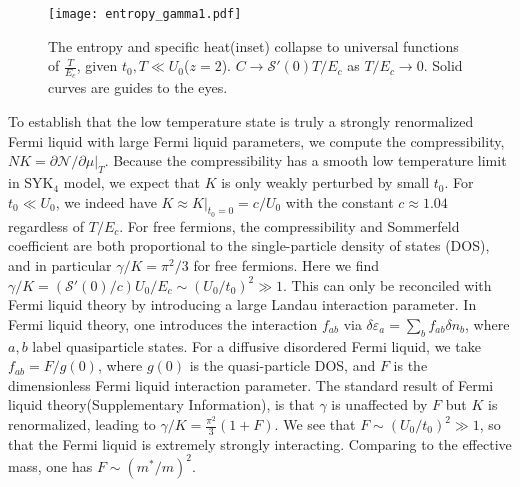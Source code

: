 \documentclass[twocolumn,floatfix,superscriptaddress]{revtex4-1}
\begin{document}
\begin{figure}[htbp] 
 \begin{center}
  \texttt{[image: entropy\_gamma1.pdf]}
 \caption{The entropy and specific heat(inset) collapse to universal functions of $\frac{T}{E_c}$, given $t_0,T\ll U_0$($z=2$).  $C\rightarrow \mathcal S'(0)T/E_c$ as $T/E_c\rightarrow 0$. Solid curves are guides to the eyes.%
  }    \label{thermo}
 \end{center}
 \end{figure}

 To establish that the low temperature state is truly a strongly renormalized Fermi liquid with large Fermi liquid parameters, we compute the compressibility, $NK = \left. \partial \mathcal N/\partial \mu\right|_T$.  Because the compressibility has a smooth low temperature limit in SYK$_4$ model, we expect that $K$ is only weakly perturbed by small $t_0$.  For $t_0 \ll U_0$, we indeed have $K \approx \left. K\right|_{t_0=0} = c/U_0$ with the constant $c\approx 1.04$ regardless of $T/E_c$.  For free fermions, the compressibility and Sommerfeld coefficient are both proportional to the single-particle density of states (DOS), and in particular $\gamma/K = \pi^2/3$ for free fermions.  Here we find $\gamma/K = (\mathcal{S}'(0)/c) U_0/E_c \sim (U_0/t_0)^2 \gg 1$.  This can only be reconciled with Fermi liquid theory by introducing a large Landau interaction parameter.  In Fermi liquid theory, one introduces the interaction $f_{ab}$ via $\delta\varepsilon_a=\sum_b f_{ab}\delta n_b$, where $a,b$ label quasiparticle states.   For a diffusive disordered Fermi liquid, we take $f_{ab} = F/g(0)$, where $g(0)$ is the quasi-particle DOS, and $F$ is the dimensionless Fermi liquid interaction parameter.  The standard result of Fermi liquid theory(Supplementary Information), is that $\gamma$ is unaffected by $F$ but $K$ is renormalized, leading to $\gamma/K = \frac{\pi^2}{3} (1+F)$.   We see that $F \sim (U_0/t_0)^2 \gg 1$, so that the Fermi liquid is extremely strongly interacting.  Comparing to the effective mass, one has $F \sim (m^*/m)^2$.
 
\end{document}
